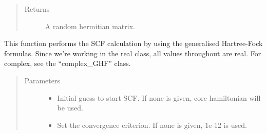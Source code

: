\documentclass[letterpaper,10pt,english]{sphinxmanual}
\begin{document}
\begin{fulllineitems}
\begin{fulllineitems}
\begin{sphinxVerbatim}[commandchars=\\\{\}]
          
   
  
\end{sphinxVerbatim}
\begin{quote}\begin{description}
\item[{Returns}] \leavevmode
A random hermitian matrix.

\end{description}\end{quote}

\end{fulllineitems}


\begin{fulllineitems}
\label{\detokenize{GHF:ghf.GHF.GHF.scf}}
This function performs the SCF calculation by using the generalised Hartree-Fock formulas. Since we’re working
in the real class, all values throughout are real. For complex, see the “complex\_GHF” class.
\begin{quote}\begin{description}
\item[{Parameters}] \leavevmode\begin{itemize}
\item {} 
 \textendash{} Initial guess to start SCF. If none is given, core hamiltonian will be used.

\item {} 
 \textendash{} Set the convergence criterion. If none is given, 1e-12 is used.


\end{itemize}
\end{description}
\end{quote}
\end{fulllineitems}
\end{fulllineitems}
\end{document}
